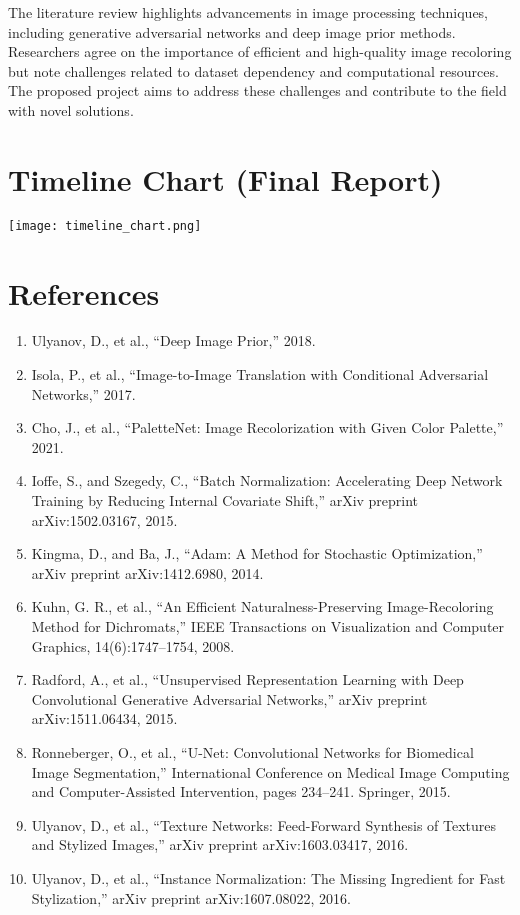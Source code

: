 \documentclass{article}
\begin{document}
The literature review highlights advancements in image processing techniques, including generative adversarial networks and deep image prior methods. Researchers agree on the importance of efficient and high-quality image recoloring but note challenges related to dataset dependency and computational resources. The proposed project aims to address these challenges and contribute to the field with novel solutions.

\section{Timeline Chart (Final Report)}

\begin{center}
\texttt{[image: timeline\_chart.png]} %
\end{center}

\section{References}

\begin{enumerate}
    \item Ulyanov, D., et al., ``Deep Image Prior,'' 2018.
    \item Isola, P., et al., ``Image-to-Image Translation with Conditional Adversarial Networks,'' 2017.
    \item Cho, J., et al., ``PaletteNet: Image Recolorization with Given Color Palette,'' 2021.
    \item Ioffe, S., and Szegedy, C., ``Batch Normalization: Accelerating Deep Network Training by Reducing Internal Covariate Shift,'' arXiv preprint arXiv:1502.03167, 2015.
    \item Kingma, D., and Ba, J., ``Adam: A Method for Stochastic Optimization,'' arXiv preprint arXiv:1412.6980, 2014.
    \item Kuhn, G. R., et al., ``An Efficient Naturalness-Preserving Image-Recoloring Method for Dichromats,'' IEEE Transactions on Visualization and Computer Graphics, 14(6):1747–1754, 2008.
    \item Radford, A., et al., ``Unsupervised Representation Learning with Deep Convolutional Generative Adversarial Networks,'' arXiv preprint arXiv:1511.06434, 2015.
    \item Ronneberger, O., et al., ``U-Net: Convolutional Networks for Biomedical Image Segmentation,'' International Conference on Medical Image Computing and Computer-Assisted Intervention, pages 234–241. Springer, 2015.
    \item Ulyanov, D., et al., ``Texture Networks: Feed-Forward Synthesis of Textures and Stylized Images,'' arXiv preprint arXiv:1603.03417, 2016.
    \item Ulyanov, D., et al., ``Instance Normalization: The Missing Ingredient for Fast Stylization,'' arXiv preprint arXiv:1607.08022, 2016.
\end{enumerate}
\end{document}
